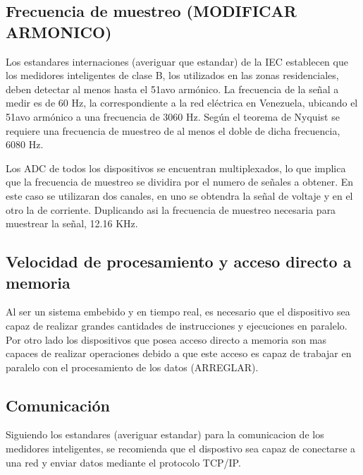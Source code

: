  \subsection{Frecuencia de muestreo (MODIFICAR ARMONICO)}
  \par Los estandares internaciones (averiguar que estandar) de la IEC establecen
  que los medidores inteligentes de clase B, los utilizados en las zonas residenciales,
  deben detectar al menos hasta el 51avo armónico. La frecuencia de la señal a medir es de 60 Hz, la
  correspondiente a la red eléctrica en Venezuela, ubicando el 51avo armónico a una frecuencia de
  3060 Hz. Según el teorema de Nyquist se requiere una frecuencia de muestreo de al menos el doble
  de dicha frecuencia, 6080 Hz.
  \par Los ADC de todos los dispositivos se encuentran multiplexados, lo que implica que
  la frecuencia de muestreo se dividira por el numero de señales a obtener. En este caso
  se utilizaran dos canales, en uno se obtendra la señal de voltaje y en el otro la de
  corriente. Duplicando asi la frecuencia de muestreo necesaria para muestrear la señal,
  12.16 KHz.

  \subsection{Velocidad de procesamiento y acceso directo a memoria}
  \par Al ser un sistema embebido y en tiempo real, es necesario que el dispositivo
  sea capaz de realizar grandes cantidades de instrucciones y ejecuciones en paralelo.
  Por otro lado los dispositivos que posea acceso directo a memoria son mas capaces de
  realizar operaciones debido a que este acceso es capaz de trabajar en paralelo con
  el procesamiento de los datos (ARREGLAR).

  \subsection{Comunicación}
  \par Siguiendo los estandares (averiguar estandar) para la comunicacion de los
  medidores inteligentes, se recomienda que el dispostivo sea capaz de conectarse a una
  red y enviar datos mediante el protocolo TCP/IP. \\


